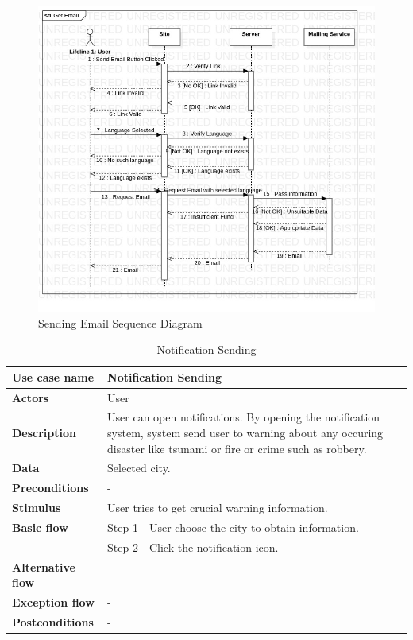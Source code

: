 \begin{figure}[H]
    \includegraphics[scale = 0.6]{assets/SequenceDiagramSuggestion.jpg}
    \caption[Sending Email Sequence Diagram]{Sending Email Sequence Diagram}
\end{figure}

\begin{center}
    \begin{table}[H]
        \begin{tabular}{| m{3cm}| m{10cm} |}
            \hline
            \textbf{Use case name} & Notification Sending\\
            \hline
            \textbf{Actors} & User\\
            \hline
            \textbf{Description} & User can open notifications. By opening the notification system, system send user to warning about any occuring disaster like tsunami or fire or crime such as robbery. \\
            \hline
            \textbf{Data} & Selected city.\\
            \hline
            \textbf{Preconditions} & - \\
            \hline
            \textbf{Stimulus} & User tries to get crucial warning information.\\
            \hline
            \textbf{Basic flow} & Step 1 - User choose the city to obtain information.\\
                                & Step 2 - Click the notification icon. \\
            \hline
            \textbf{Alternative flow} & - \\
            \hline
            \textbf{Exception flow} & - \\
            \hline
            \textbf{Postconditions} & - \\
            \hline
        \end{tabular}
        \caption[Notification Sending]{Notification Sending}
    \end{table}
\end{center}

